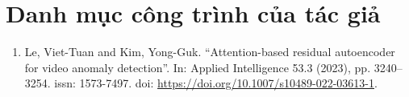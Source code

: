 \chapter*{Danh mục công trình của tác giả}
\label{Appendix1}

\begin{enumerate}
\item Le, Viet-Tuan and Kim, Yong-Guk. “Attention-based residual autoencoder for video anomaly
detection”. In: Applied Intelligence 53.3 (2023), pp. 3240–3254. issn: 1573-7497. doi: \url{https://doi.org/10.1007/s10489-022-03613-1}.

\end{enumerate}